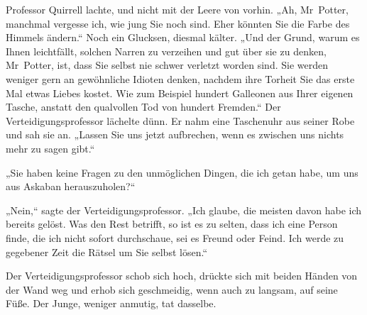 Professor Quirrell lachte, und nicht mit der Leere von vorhin. „Ah, Mr~Potter, manchmal vergesse ich, wie jung Sie noch sind. Eher könnten Sie die Farbe des Himmels ändern.“ Noch ein Glucksen, diesmal kälter. „Und der Grund, warum es Ihnen leichtfällt, solchen Narren zu verzeihen und gut über sie zu denken, Mr~Potter, ist, dass Sie selbst nie schwer verletzt worden sind. Sie werden weniger gern an gewöhnliche Idioten denken, nachdem ihre Torheit Sie das erste Mal etwas Liebes kostet. Wie zum Beispiel hundert Galleonen aus Ihrer eigenen Tasche, anstatt den qualvollen Tod von hundert Fremden.“ Der Verteidigungsprofessor lächelte dünn. Er nahm eine Taschenuhr aus seiner Robe und sah sie an. „Lassen Sie uns jetzt aufbrechen, wenn es zwischen uns nichts mehr zu sagen gibt.“

„Sie haben keine Fragen zu den unmöglichen Dingen, die ich getan habe, um uns aus Askaban herauszuholen?“

„Nein,“ sagte der Verteidigungsprofessor. „Ich glaube, die meisten davon habe ich bereits gelöst. Was den Rest betrifft, so ist es zu selten, dass ich eine Person finde, die ich nicht sofort durchschaue, sei es Freund oder Feind. Ich werde zu gegebener Zeit die Rätsel um Sie selbst lösen.“

Der Verteidigungsprofessor schob sich hoch, drückte sich mit beiden Händen von der Wand weg und erhob sich geschmeidig, wenn auch zu langsam, auf seine Füße. Der Junge, weniger anmutig, tat dasselbe.

